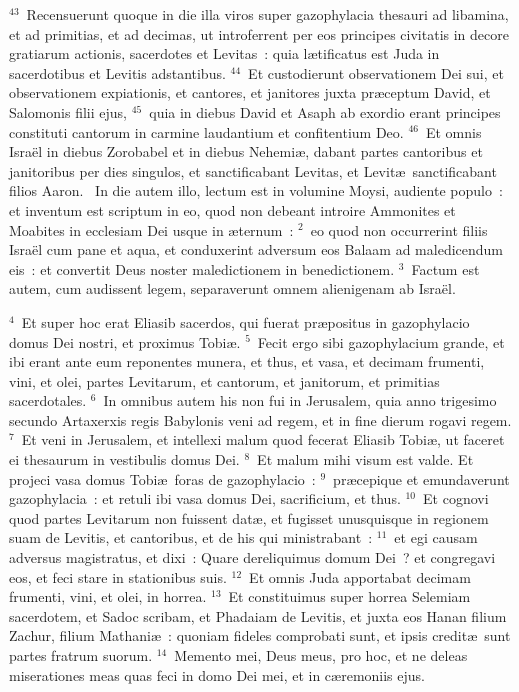 ${}^{43}$~Recensuerunt quoque in die illa viros super gazophylacia thesauri ad libamina, et ad primitias, et ad decimas, ut introferrent per eos principes civitatis in decore gratiarum actionis, sacerdotes et Levitas~: quia l\ae tificatus est Juda in sacerdotibus et Levitis adstantibus.
${}^{44}$~Et custodierunt observationem Dei sui, et observationem expiationis, et cantores, et janitores juxta pr\ae ceptum David, et Salomonis filii ejus,
${}^{45}$~quia in diebus David et Asaph ab exordio erant principes constituti cantorum in carmine laudantium et confitentium Deo.
${}^{46}$~Et omnis Isra\"el in diebus Zorobabel et in diebus Nehemi\ae , dabant partes cantoribus et janitoribus per dies singulos, et sanctificabant Levitas, et Levit\ae\ sanctificabant filios Aaron.
~\lettrine[lines=10,image=true,loversize=0.05,lraise=-0.03]{I}{}n die autem illo, lectum est in volumine Moysi, audiente populo~: et inventum est scriptum in eo, quod non debeant introire Ammonites et Moabites in ecclesiam Dei usque in \ae ternum~:
${}^{2}$~eo quod non occurrerint filiis Isra\"el cum pane et aqua, et conduxerint adversum eos Balaam ad maledicendum eis~: et convertit Deus noster maledictionem in benedictionem.
${}^{3}$~Factum est autem, cum audissent legem, separaverunt omnem alienigenam ab Isra\"el.


${}^{4}$~Et super hoc erat Eliasib sacerdos, qui fuerat pr\ae positus in gazophylacio domus Dei nostri, et proximus Tobi\ae .
${}^{5}$~Fecit ergo sibi gazophylacium grande, et ibi erant ante eum reponentes munera, et thus, et vasa, et decimam frumenti, vini, et olei, partes Levitarum, et cantorum, et janitorum, et primitias sacerdotales.
${}^{6}$~In omnibus autem his non fui in Jerusalem, quia anno trigesimo secundo Artaxerxis regis Babylonis veni ad regem, et in fine dierum rogavi regem.
${}^{7}$~Et veni in Jerusalem, et intellexi malum quod fecerat Eliasib Tobi\ae , ut faceret ei thesaurum in vestibulis domus Dei.
${}^{8}$~Et malum mihi visum est valde. Et projeci vasa domus Tobi\ae\ foras de gazophylacio~:
${}^{9}$~pr\ae cepique et emundaverunt gazophylacia~: et retuli ibi vasa domus Dei, sacrificium, et thus.
${}^{10}$~Et cognovi quod partes Levitarum non fuissent dat\ae , et fugisset unusquisque in regionem suam de Levitis, et cantoribus, et de his qui ministrabant~:
${}^{11}$~et egi causam adversus magistratus, et dixi~: Quare dereliquimus domum Dei~? et congregavi eos, et feci stare in stationibus suis.
${}^{12}$~Et omnis Juda apportabat decimam frumenti, vini, et olei, in horrea.
${}^{13}$~Et constituimus super horrea Selemiam sacerdotem, et Sadoc scribam, et Phadaiam de Levitis, et juxta eos Hanan filium Zachur, filium Mathani\ae~: quoniam fideles comprobati sunt, et ipsis credit\ae\ sunt partes fratrum suorum.
${}^{14}$~Memento mei, Deus meus, pro hoc, et ne deleas miserationes meas quas feci in domo Dei mei, et in c\ae remoniis ejus.


